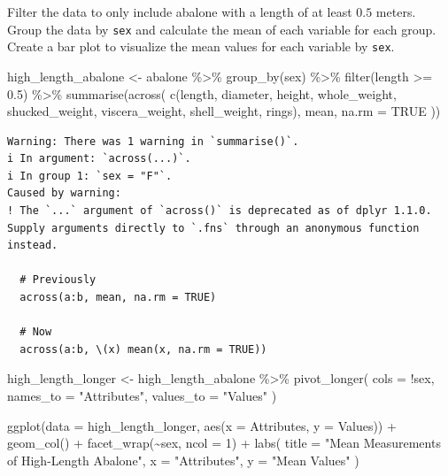 \documentclass[
  letterpaper,
  DIV=11,
  numbers=noendperiod]{scrartcl}
\newenvironment{Shaded}{\begin{snugshade}}{\end{snugshade}}
\newcommand{\AttributeTok}[1]{\textcolor[rgb]{0.40,0.45,0.13}{#1}}
\newcommand{\ConstantTok}[1]{\textcolor[rgb]{0.56,0.35,0.01}{#1}}
\newcommand{\DecValTok}[1]{\textcolor[rgb]{0.68,0.00,0.00}{#1}}
\newcommand{\FloatTok}[1]{\textcolor[rgb]{0.68,0.00,0.00}{#1}}
\newcommand{\FunctionTok}[1]{\textcolor[rgb]{0.28,0.35,0.67}{#1}}
\newcommand{\NormalTok}[1]{\textcolor[rgb]{0.00,0.23,0.31}{#1}}
\newcommand{\OtherTok}[1]{\textcolor[rgb]{0.00,0.23,0.31}{#1}}
\newcommand{\SpecialCharTok}[1]{\textcolor[rgb]{0.37,0.37,0.37}{#1}}
\newcommand{\StringTok}[1]{\textcolor[rgb]{0.13,0.47,0.30}{#1}}
\begin{document}
Filter the data to only include abalone with a length of at least
\(0.5\) meters. Group the data by \texttt{sex} and calculate the mean of
each variable for each group. Create a bar plot to visualize the mean
values for each variable by \texttt{sex}.

\begin{Shaded}
\begin{Highlighting}[]
\NormalTok{high\_length\_abalone }\OtherTok{\textless{}{-}}\NormalTok{ abalone }\SpecialCharTok{\%\textgreater{}\%}
  \FunctionTok{group\_by}\NormalTok{(sex) }\SpecialCharTok{\%\textgreater{}\%}
  \FunctionTok{filter}\NormalTok{(length }\SpecialCharTok{\textgreater{}=} \FloatTok{0.5}\NormalTok{) }\SpecialCharTok{\%\textgreater{}\%}
  \FunctionTok{summarise}\NormalTok{(}\FunctionTok{across}\NormalTok{(}
    \FunctionTok{c}\NormalTok{(length, diameter, height, whole\_weight, shucked\_weight, viscera\_weight, shell\_weight, rings),}
\NormalTok{    mean,}
    \AttributeTok{na.rm =} \ConstantTok{TRUE}
\NormalTok{  ))}
\end{Highlighting}
\end{Shaded}

\begin{verbatim}
Warning: There was 1 warning in `summarise()`.
i In argument: `across(...)`.
i In group 1: `sex = "F"`.
Caused by warning:
! The `...` argument of `across()` is deprecated as of dplyr 1.1.0.
Supply arguments directly to `.fns` through an anonymous function instead.

  # Previously
  across(a:b, mean, na.rm = TRUE)

  # Now
  across(a:b, \(x) mean(x, na.rm = TRUE))
\end{verbatim}

\begin{Shaded}
\begin{Highlighting}[]
\NormalTok{high\_length\_longer }\OtherTok{\textless{}{-}}\NormalTok{ high\_length\_abalone }\SpecialCharTok{\%\textgreater{}\%}
  \FunctionTok{pivot\_longer}\NormalTok{(}
    \AttributeTok{cols =} \SpecialCharTok{!}\NormalTok{sex,}
    \AttributeTok{names\_to =} \StringTok{"Attributes"}\NormalTok{,}
    \AttributeTok{values\_to =} \StringTok{"Values"}
\NormalTok{  )}

\FunctionTok{ggplot}\NormalTok{(}\AttributeTok{data =}\NormalTok{ high\_length\_longer, }\FunctionTok{aes}\NormalTok{(}\AttributeTok{x =}\NormalTok{ Attributes, }\AttributeTok{y =}\NormalTok{ Values)) }\SpecialCharTok{+}
  \FunctionTok{geom\_col}\NormalTok{() }\SpecialCharTok{+}  
  \FunctionTok{facet\_wrap}\NormalTok{(}\SpecialCharTok{\textasciitilde{}}\NormalTok{sex, }\AttributeTok{ncol =} \DecValTok{1}\NormalTok{) }\SpecialCharTok{+} 
  \FunctionTok{labs}\NormalTok{(}
    \AttributeTok{title =} \StringTok{"Mean Measurements of High{-}Length Abalone"}\NormalTok{,}
    \AttributeTok{x =} \StringTok{"Attributes"}\NormalTok{,}
    \AttributeTok{y =} \StringTok{"Mean Values"}
\NormalTok{  )}
\end{Highlighting}
\end{Shaded}
\end{document}
